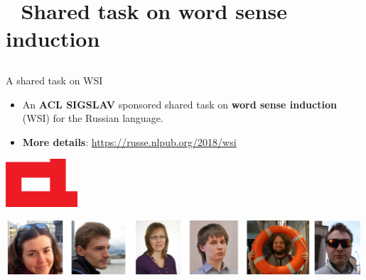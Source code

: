 \section{ $ $ $ $ Shared task on word sense induction}

\subsection{}

\begin{frame}{A shared task on WSI}
  
  \begin{itemize}
  \item An \textbf{\alert{ACL SIGSLAV}} sponsored shared task on \textbf{word sense induction} (WSI) for the Russian language.
 \end{itemize} 
  
  \begin{itemize}
    \item \textbf{More details}: \url{https://russe.nlpub.org/2018/wsi}
     
  \end{itemize}
  
  \begin{center}
  	\includegraphics[width=0.2\textwidth]{figures/acl}
  \end{center}
  
   \begin{center}
  	\includegraphics[width=0.99\textwidth]{figures/russe-team}
  \end{center}
\end{frame}



